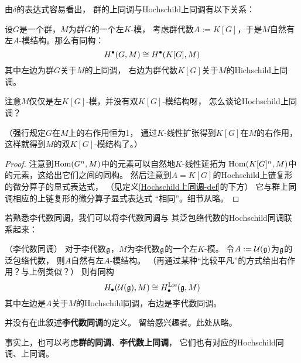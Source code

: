 由$\delta$的表达式容易看出，
群的上同调与Hochschild上同调有以下关系：

\begin{prop}设$G$是一个群，$M$为群$G$的一个左$K$-模，
考虑群代数$A:=K[G]$，于是$M$自然有左$A$-模结构。那么有同构：
$$H^{\bullet}(G,M)\cong H^{\bullet}(K[G],M)$$
其中左边为群$G$关于$M$的上同调，
右边为群代数$K[G]$关于$M$的Hichschild上同调。
\end{prop}

{\color{red}
注意$M$仅仅是左$K[G]$-模，并没有双$K[G]$-模结构呀，
怎么谈论Hochschild上同调？

\color{purple}
（强行规定$G$在$M$上的右作用恒为1，
通过$K$-线性扩张得到$K[G]$在$M$的右作用，
这样就得到$M$的双$K[G]$-模结构了。）}

\begin{proof}
注意到$\operatorname{Hom}(G^n,M)$中的元素可以自然地$K$-线性延拓为
$\operatorname{Hom}(K[G]^n,M)$中的元素，这给出它们之间的同构。
然后注意到$A=K[G]$的Hochschild上链复形的微分算子的显式表达式，
（见定义\ref{Hochschild上同调-def}的下方）
它与群上同调相应的上链复形的微分算子显式表达式
“相同”。细节从略。
\end{proof}

若熟悉李代数同调，我们可以将李代数同调与
其泛包络代数的Hochschild同调联系起来：

\begin{example}（李代数同调）%
对于李代数$\mathfrak{g}$，$M$为李代数$\mathfrak{g}$的一个左$K$-模。
令$A:=\mathcal{U}(\mathfrak{g})$为$\mathfrak{g}$的泛包络代数，
则$A$自然有左$A$-模结构。
（再通过某种“比较平凡”的方式给出右作用？与上例类似？）
则有同构
$$H_{\bullet}(\mathcal{U}(\mathfrak{g}),M)
\cong H^{\operatorname{Lie}}_{\bullet}(\mathfrak{g},M)$$
其中左边是$A$关于$M$的Hochschild同调，右边是李代数同调。
\end{example}

并没有在此叙述\textbf{李代数同调}的定义。
留给感兴趣者。此处从略。

事实上，也可以考虑\textbf{群的同调}、\textbf{李代数上同调}，
它们也有对应的Hochschild同调、上同调。








